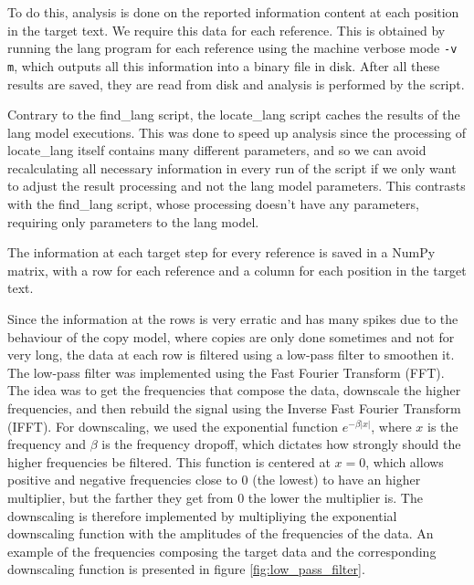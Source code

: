 \documentclass{article}
\begin{document}
To do this, analysis is done on the reported information content at each position in the target text.
We require this data for each reference.
This is obtained by running the lang program for each reference using the machine verbose mode \verb|-v m|, which outputs all this information into a binary file in disk.
After all these results are saved, they are read from disk and analysis is performed by the script.

Contrary to the find_lang script, the locate_lang script caches the results of the lang model executions.
This was done to speed up analysis since the processing of locate_lang itself contains many different parameters, and so we can avoid recalculating all necessary information in every run of the script if we only want to adjust the result processing and not the lang model parameters.
This contrasts with the find_lang script, whose processing doesn't have any parameters, requiring only parameters to the lang model.

The information at each target step for every reference is saved in a NumPy matrix, with a row for each reference and a column for each position in the target text.

Since the information at the rows is very erratic and has many spikes due to the behaviour of the copy model, where copies are only done sometimes and not for very long, the data at each row is filtered using a low-pass filter to smoothen it.
The low-pass filter was implemented using the Fast Fourier Transform (FFT).
The idea was to get the frequencies that compose the data, downscale the higher frequencies, and then rebuild the signal using the Inverse Fast Fourier Transform (IFFT).
For downscaling, we used the exponential function $e^{-\beta|x|}$, where $x$ is the frequency and $\beta$ is the frequency dropoff, which dictates how strongly should the higher frequencies be filtered.
This function is centered at $x=0$, which allows positive and negative frequencies close to 0 (the lowest) to have an higher multiplier, but the farther they get from 0 the lower the multiplier is.
The downscaling is therefore implemented by multipliying the exponential downscaling function with the amplitudes of the frequencies of the data.
An example of the frequencies composing the target data and the corresponding downscaling function is presented in figure \ref{fig:low_pass_filter}.
\end{document}
